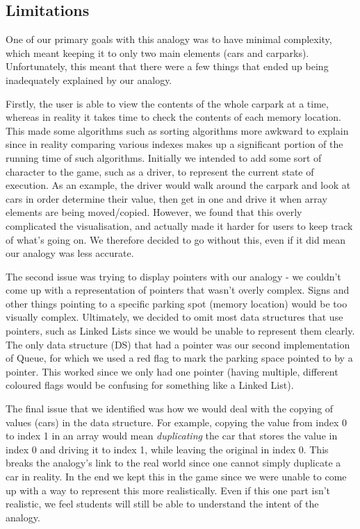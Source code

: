 \documentclass[11pt]{article}
\begin{document}
\subsection{Limitations}
\label{analogyLimits}
One of our primary goals with this analogy was to have minimal complexity, which meant keeping it to only two main elements (cars and carparks). Unfortunately, this meant that there were a few things that ended up being inadequately explained by our analogy.\par
Firstly, the user is able to view the contents of the whole carpark at a time, whereas in reality it takes time to check the contents of each memory location. This made some algorithms such as sorting algorithms more awkward to explain since in reality comparing various indexes makes up a significant portion of the running time of such algorithms. Initially we intended to add some sort of character to the game, such as a driver, to represent the current state of execution. As an example, the driver would walk around the carpark and look at cars in order determine their value, then get in one and drive it when array elements are being moved/copied. However, we found that this overly complicated the visualisation, and actually made it harder for users to keep track of what's going on. We therefore decided to go without this, even if it did mean our analogy was less accurate.\par
The second issue was trying to display pointers with our analogy - we couldn't come up with a representation of pointers that wasn't overly complex. Signs and other things pointing to a specific parking spot (memory location) would be too visually complex. Ultimately, we decided to omit most data structures that use pointers, such as Linked Lists since we would be unable to represent them clearly. The only data structure (DS) that had a pointer was our second implementation of Queue, for which we used a red flag to mark the parking space pointed to by a pointer. This worked since we only had one pointer (having multiple, different coloured flags would be confusing for something like a Linked List).\par
The final issue that we identified was how we would deal with the copying of values (cars) in the data structure. For example, copying the value from index 0 to index 1 in an array would mean \emph{duplicating} the car that stores the value in index 0 and driving it to index 1, while leaving the original in index 0. This breaks the analogy's link to the real world since one cannot simply duplicate a car in reality. In the end we kept this in the game since we were unable to come up with a way to represent this more realistically. Even if this one part isn't realistic, we feel students will still be able to understand the intent of the analogy.
\end{document}
